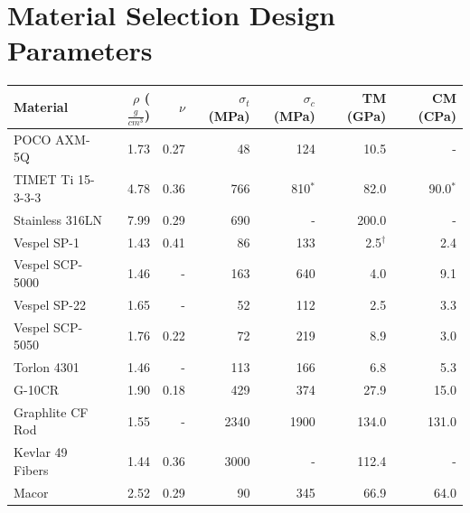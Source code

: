 \documentclass[final]{svjour2}
\begin{document}
\section{Material Selection Design Parameters}

\begin{table}[h]%
\begin{tabular}{lrrrrrr}
\toprule
\textbf{Material} & $\rho$ ($\frac{g}{cm^3}$) & $\nu$ & $\sigma_{t}$ (MPa) & $\sigma_{c}$ (MPa) & TM (GPa) & CM (CPa) \\
\midrule
 POCO AXM-5Q & 1.73 & 0.27 & 48 & 124\phantom{$^*$} & 10.5\phantom{$^{\dag}$} & -\phantom{$^*$} \\
 TIMET Ti 15-3-3-3 & 4.78 & 0.36 & 766 & 810$^*$ & 82.0\phantom{$^{\dag}$} & 90.0$^*$ \\
 Stainless 316LN & 7.99 & 0.29 & 690 & -\phantom{$^*$} & 200.0\phantom{$^{\dag}$} & -\phantom{$^*$} \\
 Vespel SP-1 & 1.43 & 0.41 & 86 & 133\phantom{$^*$} & 2.5$^{\dag}$ & 2.4\phantom{$^*$} \\
 Vespel SCP-5000 & 1.46 & - & 163 & 640\phantom{$^*$} & 4.0\phantom{$^{\dag}$} & 9.1\phantom{$^*$} \\
 Vespel SP-22 & 1.65 & - & 52 & 112\phantom{$^*$} & 2.5\phantom{$^{\dag}$} & 3.3\phantom{$^*$} \\
 Vespel SCP-5050 & 1.76 & 0.22 & 72 & 219\phantom{$^*$} & 8.9\phantom{$^{\dag}$} & 3.0\phantom{$^*$} \\
 Torlon 4301 & 1.46 & - & 113 & 166\phantom{$^*$} & 6.8\phantom{$^{\dag}$} & 5.3\phantom{$^*$} \\
 G-10CR & 1.90 & 0.18 & 429 & 374\phantom{$^*$} & 27.9\phantom{$^{\dag}$} & 15.0\phantom{$^*$} \\
 Graphlite CF Rod & 1.55 & -  & 2340 & 1900\phantom{$^*$} & 134.0\phantom{$^{\dag}$} & 131.0\phantom{$^*$} \\
 Kevlar 49 Fibers & 1.44 & 0.36 & 3000 & -\phantom{$^*$} & 112.4\phantom{$^{\dag}$} & -\phantom{$^*$} \\
 Macor & 2.52 & 0.29 & 90 & 345\phantom{$^*$} & 66.9\phantom{$^{\dag}$} & 64.0\phantom{$^*$} \\


\end{tabular}
\end{table}
\end{document}
